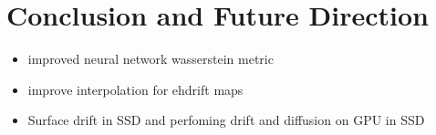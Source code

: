 \chapter{Conclusion and Future Direction}
\begin{itemize}
    \item improved neural network wasserstein metric
    \item improve interpolation for ehdrift maps
    \item Surface drift in SSD and perfoming drift and diffusion on GPU in SSD
\end{itemize}
\label{chap:conclusion}